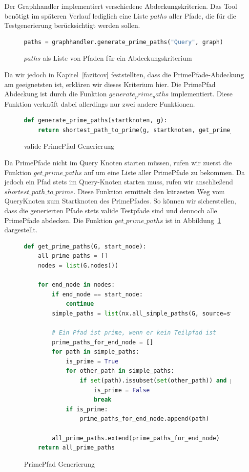 Der Graphhandler implementiert verschiedene Abdeckungskriterien.
Das Tool benötigt im späteren Verlauf lediglich eine Liste $paths$ aller Pfade, die für die Testgenerierung berücksichtigt werden sollen.

\begin{figure}[H]
    \begin{lstlisting}[language=Python]
paths = graphhandler.generate_prime_paths("Query", graph)
    \end{lstlisting}
    \caption{$paths$ als Liste von Pfaden für ein Abdeckungskriterium}
\end{figure}

Da wir jedoch in Kapitel~\ref{fazitcov} feststellten, dass die PrimePfade-Abdeckung am geeignetsten ist, erklären wir dieses Kriterium hier.
Die PrimePfad Abdeckung ist durch die Funktion $generate_prime_paths$ implementiert.
Diese Funktion verknüft dabei allerdings nur zwei andere Funktionen.

\begin{figure}[H]
    \begin{lstlisting}[language=Python]
def generate_prime_paths(startknoten, g):
    return shortest_path_to_prime(g, startknoten, get_prime_paths(g, startknoten))
    \end{lstlisting}
    \caption{valide PrimePfad Generierung}
\end{figure}

Da PrimePfade nicht im Query Knoten starten müssen, rufen wir zuerst die Funktion $get\_prime\_paths$ auf um eine Liste
aller PrimePfade zu bekommen.
Da jedoch ein Pfad stets im Query-Knoten starten muss, rufen wir anschließend $shortest\_path\_to\_prime$.
Diese Funktion ermittelt den kürzesten Weg vom QueryKnoten zum Startknoten des PrimePfades.
So können wir sicherstellen, dass die generierten Pfade stets valide Testpfade sind und dennoch alle PrimePfade abdecken.
Die Funktion $get\_prime\_paths$ ist in Abbildung~\ref{getprime} dargestellt.

\begin{figure}
    \begin{lstlisting}[language=Python]
def get_prime_paths(G, start_node):
    all_prime_paths = []
    nodes = list(G.nodes())

    for end_node in nodes:
        if end_node == start_node:
            continue
        simple_paths = list(nx.all_simple_paths(G, source=start_node, target=end_node))

        # Ein Pfad ist prime, wenn er kein Teilpfad ist
        prime_paths_for_end_node = []
        for path in simple_paths:
            is_prime = True
            for other_path in simple_paths:
                if set(path).issubset(set(other_path)) and path != other_path:
                    is_prime = False
                    break
            if is_prime:
                prime_paths_for_end_node.append(path)

        all_prime_paths.extend(prime_paths_for_end_node)
    return all_prime_paths
    \end{lstlisting}
    \caption{PrimePfad Generierung}
    \label{getprime}
\end{figure}

